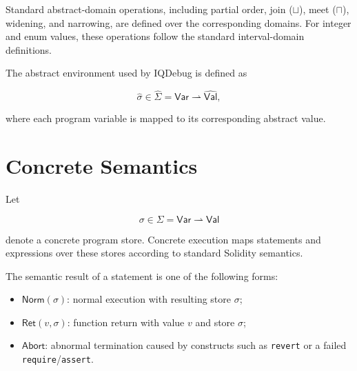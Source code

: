 \documentclass[11pt,oneside]{report}
\theoremstyle{plain}
\theoremstyle{definition}
\theoremstyle{remark}
\newcommand{\Abort}{\mathsf{Abort}}
\newcommand{\Norm}{\mathsf{Norm}}
\newcommand{\Ret}{\mathsf{Ret}}
\begin{document}
Standard abstract-domain operations, including partial order, join (\(\sqcup\)), meet (\(\sqcap\)), widening, and narrowing, are defined over the corresponding domains.
For integer and enum values, these operations follow the standard interval-domain definitions.

The abstract environment used by IQDebug is defined as

$$ \hat{\sigma} \in \widehat{\Sigma} = \mathsf{Var} \rightharpoonup \widehat{\mathsf{Val}}, $$

where each program variable is mapped to its corresponding abstract value.

\section{Concrete Semantics}

Let

$$ \sigma \in \Sigma = \mathsf{Var} \rightharpoonup \mathsf{Val} $$

denote a concrete program store.
Concrete execution maps statements and expressions over these stores according to standard Solidity semantics.

The semantic result of a statement is one of the following forms:

\begin{itemize}
\item \(\Norm(\sigma)\): normal execution with resulting store \(\sigma\);
\item \(\Ret(v,\sigma)\): function return with value \(v\) and store \(\sigma\);
\item \(\Abort\): abnormal termination caused by constructs such as \texttt{revert} or a failed \texttt{require}/\texttt{assert}.
\end{itemize}
\end{document}
